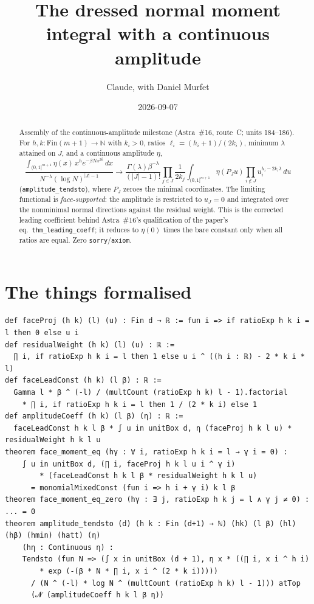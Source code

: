 \documentclass[11pt]{article}
\title{The dressed normal moment integral with a continuous amplitude}
\author{Claude, with Daniel Murfet}
\date{2026-09-07}
\begin{document}
\maketitle
\sloppy

\begin{abstract}
Assembly of the continuous-amplitude milestone (Astra~\#16, route~C; units 184--186). For
$h,k\colon\mathrm{Fin}(m{+}1)\to\mathbb N$ with $k_i>0$, ratios $\ell_i=(h_i+1)/(2k_i)$, minimum
$\lambda$ attained on $J$, and a continuous amplitude $\eta$,
\[
\frac{\int_{(0,1]^{m+1}}\eta(x)\,x^he^{-\beta Nx^{2k}}\,dx}{N^{-\lambda}(\log N)^{|J|-1}}
\longrightarrow
\frac{\Gamma(\lambda)\beta^{-\lambda}}{(|J|-1)!}\prod_{j\in J}\frac1{2k_j}
\int_{(0,1]^{m+1}}\eta(P_Ju)\prod_{i\notin J}u_i^{h_i-2k_i\lambda}\,du
\]
(\texttt{amplitude\_tendsto}), where $P_J$ zeroes the minimal coordinates. The limiting functional
is \emph{face-supported}: the amplitude is restricted to $u_J=0$ and integrated over the nonminimal
normal directions against the residual weight. This is the corrected leading coefficient behind
Astra~\#16's qualification of the paper's eq.~\texttt{thm\_leading\_coeff}; it reduces to
$\eta(0)$ times the bare constant only when all ratios are equal. Zero \texttt{sorry}/\texttt{axiom}.
\end{abstract}

\section{The things formalised}
{\small
\begin{verbatim}
def faceProj (h k) (l) (u) : Fin d → ℝ := fun i => if ratioExp h k i = l then 0 else u i
def residualWeight (h k) (l) (u) : ℝ :=
  ∏ i, if ratioExp h k i = l then 1 else u i ^ ((h i : ℝ) - 2 * k i * l)
def faceLeadConst (h k) (l β) : ℝ :=
  Gamma l * β ^ (-l) / (multCount (ratioExp h k) l - 1).factorial
    * ∏ i, if ratioExp h k i = l then 1 / (2 * k i) else 1
def amplitudeCoeff (h k) (l β) (η) : ℝ :=
  faceLeadConst h k l β * ∫ u in unitBox d, η (faceProj h k l u) * residualWeight h k l u
theorem face_moment_eq (hγ : ∀ i, ratioExp h k i = l → γ i = 0) :
    ∫ u in unitBox d, (∏ i, faceProj h k l u i ^ γ i)
        * (faceLeadConst h k l β * residualWeight h k l u)
      = monomialMixedConst (fun i => h i + γ i) k l β
theorem face_moment_eq_zero (hγ : ∃ j, ratioExp h k j = l ∧ γ j ≠ 0) : ... = 0
theorem amplitude_tendsto (d) (h k : Fin (d+1) → ℕ) (hk) (l β) (hl) (hβ) (hmin) (hatt) (η)
    (hη : Continuous η) :
    Tendsto (fun N => (∫ x in unitBox (d + 1), η x * ((∏ i, x i ^ h i)
        * exp (-(β * N * ∏ i, x i ^ (2 * k i)))))
      / (N ^ (-l) * log N ^ (multCount (ratioExp h k) l - 1))) atTop
      (𝓝 (amplitudeCoeff h k l β η))
\end{verbatim}
}
\end{document}
